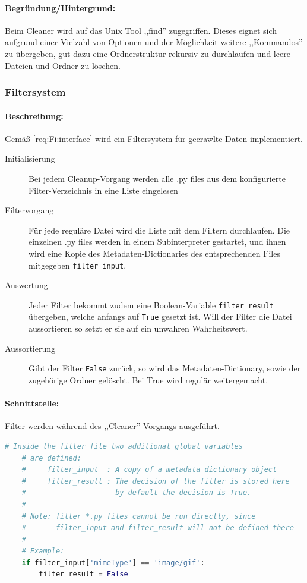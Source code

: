 \paragraph{Begründung/Hintergrund:}
\label{par:hintergrund_}
Beim Cleaner wird auf das Unix Tool ,,find'' zugegriffen. Dieses eignet sich aufgrund einer Vielzahl
von Optionen und der Möglichkeit weitere ,,Kommandos'' zu übergeben, gut dazu eine Ordnerstruktur rekursiv
zu durchlaufen und leere Dateien und Ordner zu löschen.


\subsubsection{Filtersystem}
\label{ssub:filtersystem}
\paragraph{Beschreibung:}
\label{par:beschreibung_}
Gemäß \ref{req:Fi:interface} wird ein Filtersystem für gecrawlte Daten
implementiert.

\begin{description}
  \item[Initialisierung] Bei jedem Cleanup-Vorgang werden alle .py files
    aus dem konfigurierte Filter-Verzeichnis in eine Liste eingelesen
  \item[Filtervorgang] Für jede reguläre Datei wird die Liste mit dem
    Filtern durchlaufen. Die einzelnen .py files werden in einem
    Subinterpreter gestartet, und ihnen wird eine Kopie des
    Metadaten-Dictionaries des entsprechenden Files mitgegeben
    \texttt{filter\_input}.
  \item[Auswertung] Jeder Filter bekommt zudem eine Boolean-Variable
    \texttt{filter\_result} übergeben, welche anfangs auf \texttt{True}
    gesetzt ist. Will der Filter die Datei aussortieren so setzt er sie
    auf ein unwahren Wahrheitswert. 
  \item[Aussortierung] Gibt der Filter \texttt{False} zurück, so wird
    das Metadaten-Dictionary, sowie der zugehörige Ordner gelöscht. 
    Bei True wird regulär weitergemacht.
\end{description}

\paragraph{Schnittstelle:}
\label{par:schnittstelle_}
Filter werden während des ,,Cleaner'' Vorgangs ausgeführt.
\begin{lstlisting}[language=python]
    # Inside the filter file two additional global variables
    # are defined:
    #     filter_input  : A copy of a metadata dictionary object
    #     filter_result : The decision of the filter is stored here
    #                     by default the decision is True.
    #
    # Note: filter *.py files cannot be run directly, since 
    #       filter_input and filter_result will not be defined there
    #
    # Example:
    if filter_input['mimeType'] == 'image/gif':
        filter_result = False
\end{lstlisting}

